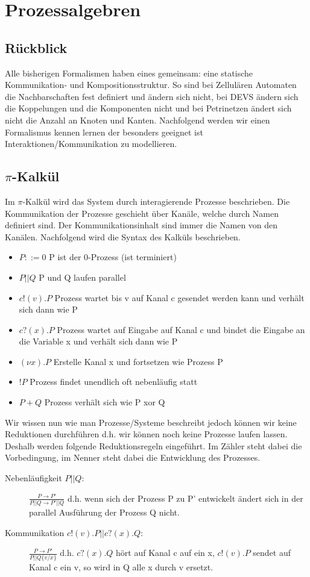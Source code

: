 \documentclass[11pt, fleqn, a4paper, leqno]{scrartcl} %
\begin{document}
\section{Prozessalgebren}
	\subsection{Rückblick}
		Alle bisherigen Formalismen haben eines gemeinsam: eine statische Kommunikation- und Kompositionsstruktur. So sind bei Zellulären Automaten die Nachbarschaften fest definiert und ändern sich nicht, bei DEVS ändern sich die Koppelungen und die Komponenten nicht und bei Petrinetzen ändert sich nicht die Anzahl an Knoten und Kanten. Nachfolgend werden wir einen Formalismus kennen lernen der besonders geeignet ist Interaktionen/Kommunikation zu modellieren.
	\subsection{$\pi$-Kalkül}
		Im $\pi$-Kalkül wird das System durch interagierende Prozesse beschrieben. Die Kommunikation der Prozesse geschieht über Kanäle, welche durch Namen definiert sind. Der Kommunikationsinhalt sind immer die Namen von den Kanälen. Nachfolgend wird die Syntax des Kalküls beschrieben.
		\begin{itemize}
			\item $P::= 0$ P ist der 0-Prozess (ist terminiert)
			\item $P||Q$ P und Q laufen parallel
			\item $c!(v).P$ Prozess wartet bis v auf Kanal c gesendet werden kann und verhält sich dann wie P
			\item $c?(x).P$ Prozess wartet auf Eingabe auf Kanal c und bindet die Eingabe an die Variable x und verhält sich dann wie P
			\item $(\nu x).P$ Erstelle Kanal x und fortsetzen wie Prozess P
			\item $!P$ Prozess findet unendlich oft nebenläufig statt
			\item $P+Q$ Prozess verhält sich wie P xor Q
		\end{itemize}
		Wir wissen nun wie man Prozesse/Systeme beschreibt jedoch können wir keine Reduktionen durchführen d.h. wir können noch keine Prozesse laufen lassen. Deshalb werden folgende Reduktionsregeln eingeführt. Im Zähler steht dabei die Vorbedingung, im Nenner steht dabei die Entwicklung des Prozesses.
		\begin{description}
			\item [Nebenläufigkeit $P||Q$:] $\frac{P \rightarrow P'}{P||Q \rightarrow P'||Q}$ d.h. wenn sich der Prozess P zu P' entwickelt ändert sich in der parallel Ausführung der Prozess Q nicht.
			\item [Kommunikation $c!(v).P || c?(x).Q$:] $\frac{P \rightarrow P'}{P || Q\{v/x\}}$ d.h. $c?(x).Q$ hört auf Kanal c auf ein x, $c!(v).P$ sendet auf Kanal c ein v, so wird in Q alle x durch v ersetzt.
		\end{description}
\end{document}
